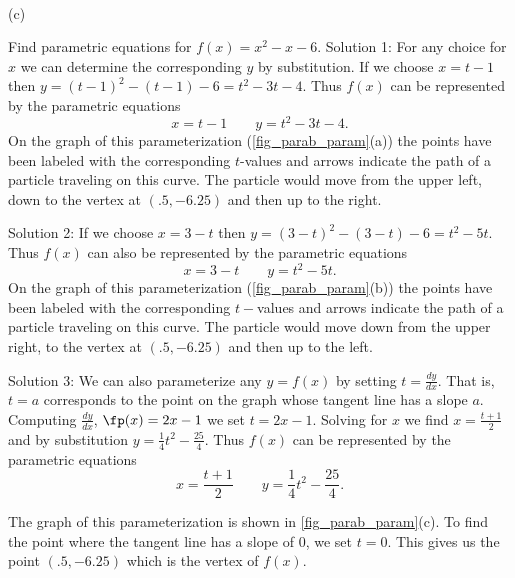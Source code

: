 {
\\(c)}

\begin{example}\label{ex_pareq5}
Find parametric equations for $f(x)=x^2-x-6$.
\solution
Solution 1: For any choice for $x$ we can determine the corresponding $y$ by substitution. If we choose $x=t-1$ then $y=(t-1)^2-(t-1)-6=t^2-3t-4$. Thus $f(x)$ can be represented by the parametric equations
\[x=t-1 \qquad y=t^2-3t-4.\]
On the graph of this parameterization (\autoref{fig_parab_param}(a)) the points have been labeled with the corresponding $t$-values and arrows indicate the path of a particle traveling on this curve. The particle would move from the upper left, down to the vertex at $(.5,-6.25)$ and then up to the right.

Solution 2: If we choose $x=3-t$ then $y=(3-t)^2-(3-t)-6=t^2-5t$. Thus $f(x)$ can also be represented by the parametric equations
\[x=3-t \qquad y=t^2-5t.\]
On the graph of this parameterization (\autoref{fig_parab_param}(b)) the points have been labeled with the corresponding $t-$values and arrows indicate the path of a particle traveling on this curve. The particle would move down from the upper right, to the vertex at $(.5,-6.25)$ and then up to the left.

Solution 3: We can also parameterize any $y=f(x)$ by setting $t=\frac{dy}{dx}$. That is, $t=a$ corresponds to the point on the graph whose tangent line has a slope $a$. Computing $\frac{dy}{dx}$, $\fp(x) = 2x-1$ we set $t=2x-1$. Solving for $x$ we find $x=\frac{t+1}{2}$ and by substitution $y=\frac{1}{4}t^2 - \frac{25}{4}$. Thus $f(x)$ can be represented by the parametric equations
\[x=\frac{t+1}{2} \qquad y=\frac{1}{4}t^2 - \frac{25}{4}.\]

The graph of this parameterization is shown in \autoref{fig_parab_param}(c). To find the point where the tangent line has a slope of $0$, we set $t=0$. This gives us the point $(.5, -6.25)$ which is the vertex of $f(x)$.
\end{example}

